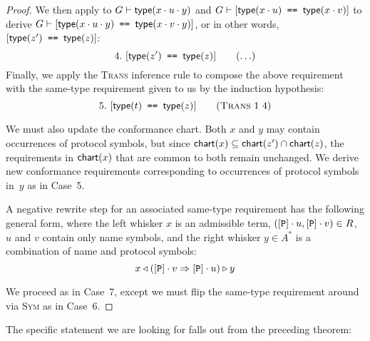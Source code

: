 \documentclass[../generics]{subfiles}
\begin{document}
\begin{proof}
We then apply  to $G\vdash\texttt{$\mathsf{type}(x\cdot u\cdot y)$}$ and $G\vdash[\texttt{$\mathsf{type}(x\cdot u)$ == $\mathsf{type}(x\cdot v)$}]$ to derive $G\vdash[\texttt{$\mathsf{type}(x\cdot u\cdot y)$ == $\mathsf{type}(x\cdot v\cdot y)$}]$, or in other words, $[\texttt{$\mathsf{type}(z^\prime)$ == $\mathsf{type}(z)$}]$:
\[
\AnyStep{\SameReq{$\Type(z^\prime)$}{$\Type(z)$}}{4}
\]
Finally, we apply the \textsc{Trans} inference rule to compose the above requirement with the same-type requirement given to us by the induction hypothesis:
\[
\TransStep{1}{4}{$\Type(t)$}{$\Type(z)$}{5}
\]

We must also update the conformance chart. Both $x$ and $y$ may contain occurrences of protocol symbols, but since $\mathsf{chart}(x)\subseteq\mathsf{chart}(z^\prime)\cap\mathsf{chart}(z)$, the requirements in $\mathsf{chart}(x)$ that are common to both remain unchanged. We derive new conformance requirements corresponding to occurrences of protocol symbols in~$y$ as in Case~5.

 A negative rewrite step for an associated same-type requirement has the following general form, where the left whisker $x$ is an admissible term, $([\texttt{P}]\cdot u,[\texttt{P}]\cdot v)\in R$, $u$ and $v$ contain only name symbols, and 
the right whisker $y\in A^*$ is a combination of name and protocol symbols:
\[x\triangleleft([\texttt{P}]\cdot v\Rightarrow[\texttt{P}]\cdot u)\triangleright y\]

We proceed as in Case~7, except we must flip the same-type requirement around via \textsc{Sym} as in Case~6.
\end{proof}

The specific statement we are looking for falls out from the preceding theorem:
\end{document}
